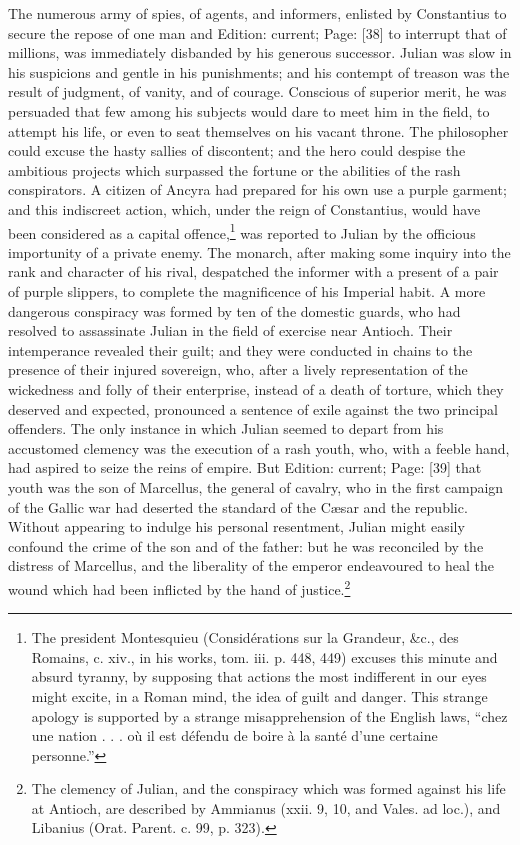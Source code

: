The numerous army of spies, of agents, and informers, enlisted by Constantius to secure the repose of one man and Edition: current; Page: [38] to interrupt that of millions, was immediately disbanded by his generous successor. Julian was slow in his suspicions and gentle in his punishments; and his contempt of treason was the result of judgment, of vanity, and of courage. Conscious of superior merit, he was persuaded that few among his subjects would dare to meet him in the field, to attempt his life, or even to seat themselves on his vacant throne. The philosopher could excuse the hasty sallies of discontent; and the hero could despise the ambitious projects which surpassed the fortune or the abilities of the rash conspirators. A citizen of Ancyra had prepared for his own use a purple garment; and this indiscreet action, which, under the reign of Constantius, would have been considered as a capital offence,\footnote{The president Montesquieu (Considérations sur la Grandeur, \&c., des Romains, c. xiv., in his works, tom. iii. p. 448, 449) excuses this minute and absurd tyranny, by supposing that actions the most indifferent in our eyes might excite, in a Roman mind, the idea of guilt and danger. This strange apology is supported by a strange misapprehension of the English laws, \texthebrew{“}chez une nation . . . où il est défendu de boire à la santé d\texthebrew{}’une certaine personne.\texthebrew{}”} was reported to Julian by the officious importunity of a private enemy. The monarch, after making some inquiry into the rank and character of his rival, despatched the informer with a present of a pair of purple slippers, to complete the magnificence of his Imperial habit. A more dangerous conspiracy was formed by ten of the domestic guards, who had resolved to assassinate Julian in the field of exercise near Antioch. Their intemperance revealed their guilt; and they were conducted in chains to the presence of their injured sovereign, who, after a lively representation of the wickedness and folly of their enterprise, instead of a death of torture, which they deserved and expected, pronounced a sentence of exile against the two principal offenders. The only instance in which Julian seemed to depart from his accustomed clemency was the execution of a rash youth, who, with a feeble hand, had aspired to seize the reins of empire. But Edition: current; Page: [39] that youth was the son of Marcellus, the general of cavalry, who in the first campaign of the Gallic war had deserted the standard of the Cæsar and the republic. Without appearing to indulge his personal resentment, Julian might easily confound the crime of the son and of the father: but he was reconciled by the distress of Marcellus, and the liberality of the emperor endeavoured to heal the wound which had been inflicted by the hand of justice.\footnote{The clemency of Julian, and the conspiracy which was formed against his life at Antioch, are described by Ammianus (xxii. 9, 10, and Vales. ad loc.), and Libanius (Orat. Parent. c. 99, p. 323).}

